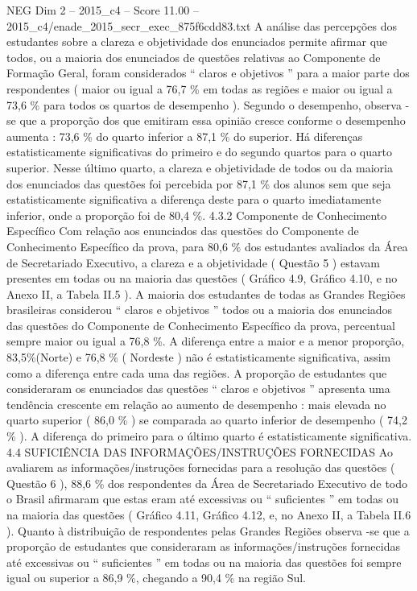 \begin{textsample}{NEG Dim 2 – 2015\_c4 – Score 11.00 – 2015\_c4/enade\_2015\_secr\_exec\_875f6cdd83.txt}
A análise das percepções dos estudantes sobre a clareza e objetividade dos enunciados permite afirmar que todos, ou a maioria dos enunciados de questões relativas ao Componente de Formação Geral, foram considerados “ claros e objetivos ” para a maior parte dos respondentes ( maior ou igual a 76,7 \% em todas as regiões e maior ou igual a 73,6 \% para todos os quartos de desempenho ).
Segundo o desempenho, observa -se que a proporção dos que emitiram essa opinião cresce conforme o desempenho aumenta : 73,6 \% do quarto inferior a 87,1 \% do superior.
Há diferenças estatisticamente significativas do primeiro e do segundo quartos para o quarto superior.
Nesse último quarto, a clareza e objetividade de todos ou da maioria dos enunciados das questões foi percebida por 87,1 \% dos alunos sem que seja estatisticamente significativa a diferença deste para o quarto imediatamente inferior, onde a proporção foi de 80,4 \%. 4.3.2 Componente de Conhecimento Específico Com relação aos enunciados das questões do Componente de Conhecimento Específico da prova, para 80,6 \% dos estudantes avaliados da Área de Secretariado Executivo, a clareza e a objetividade ( Questão 5 ) estavam presentes em todas ou na maioria das questões ( Gráfico 4.9, Gráfico 4.10, e no Anexo II, a Tabela II.5 ).
A maioria dos estudantes de todas as Grandes Regiões brasileiras considerou “ claros e objetivos ” todos ou a maioria dos enunciados das questões do Componente de Conhecimento Específico da prova, percentual sempre maior ou igual a 76,8 \%.
A diferença entre a maior e a menor proporção, 83,5\%(Norte) e 76,8 \% ( Nordeste ) não é estatisticamente significativa, assim como a diferença entre cada uma das regiões.
A proporção de estudantes que consideraram os enunciados das questões “ claros e objetivos ” apresenta uma tendência crescente em relação ao aumento de desempenho : mais elevada no quarto superior ( 86,0 \% ) se comparada ao quarto inferior de desempenho ( 74,2 \% ).
A diferença do primeiro para o último quarto é estatisticamente significativa. 4.4 SUFICIÊNCIA DAS INFORMAÇÕES/INSTRUÇÕES FORNECIDAS Ao avaliarem as informações/instruções fornecidas para a resolução das questões ( Questão 6 ), 88,6 \% dos respondentes da Área de Secretariado Executivo de todo o Brasil afirmaram que estas eram até excessivas ou “ suficientes ” em todas ou na maioria das questões ( Gráfico 4.11, Gráfico 4.12, e, no Anexo II, a Tabela II.6 ).
Quanto à distribuição de respondentes pelas Grandes Regiões observa -se que a proporção de estudantes que consideraram as informações/instruções fornecidas até excessivas ou “ suficientes ” em todas ou na maioria das questões foi sempre igual ou superior a 86,9 \%, chegando a 90,4 \% na região Sul.

\end{textsample}
